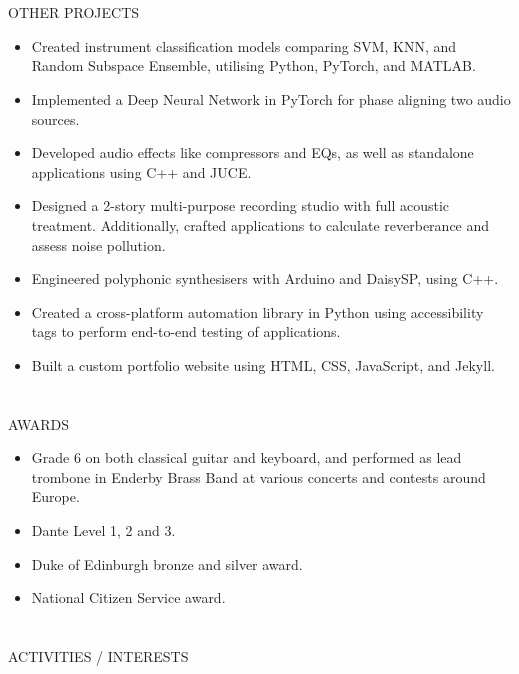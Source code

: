 \documentclass{my_cv}
\begin{document}
\begin{multicols}{2}
\section{\faPaintBrush}{OTHER PROJECTS}
\begin{itemize}[noitemsep]
    \item Created instrument classification models comparing SVM, KNN, and Random Subspace Ensemble, utilising Python, PyTorch, and MATLAB.
    \item Implemented a Deep Neural Network in PyTorch for phase aligning two audio sources.
    \item Developed audio effects like compressors and EQs, as well as standalone applications using C++ and JUCE.
    \item Designed a 2-story multi-purpose recording studio with full acoustic treatment. Additionally, crafted applications to calculate reverberance and assess noise pollution.
    \item Engineered polyphonic synthesisers with Arduino and DaisySP, using C++.
    \item Created a cross-platform automation library in Python using accessibility tags to perform end-to-end testing of applications.
    \item Built a custom portfolio website using HTML, CSS, JavaScript, and Jekyll.
\end{itemize}

\section{\faStar}{AWARDS}

\begin{itemize}[noitemsep]
    \item Grade 6 on both classical guitar and keyboard, and performed as lead trombone in Enderby Brass Band at various concerts and contests around Europe.
    \item Dante Level 1, 2 and 3.
    \item Duke of Edinburgh bronze and silver award.
    \item National Citizen Service award.
\end{itemize}

\section{\faSoccerBallO}{ACTIVITIES / INTERESTS}


\end{multicols}
\end{document}
